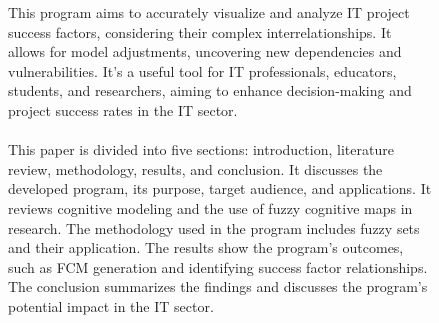 \documentclass{article}
\begin{document}
\begin{figure}[!t]
\begin{minipage}{0.49\textwidth}
            This program aims to accurately visualize and analyze IT project success factors, considering their complex interrelationships. It allows for model adjustments, uncovering new dependencies and vulnerabilities. It's a useful tool for IT professionals, educators, students, and researchers, aiming to enhance decision-making and project success rates in the IT sector.\\
            ~\\
            This paper is divided into five sections: introduction, literature review, methodology, results, and conclusion. It discusses the developed program, its purpose, target audience, and applications. It reviews cognitive modeling and the use of fuzzy cognitive maps in research. The methodology used in the program includes fuzzy sets and their application. The results show the program's outcomes, such as FCM generation and identifying success factor relationships. The conclusion summarizes the findings and discusses the program's potential impact in the IT sector.\\
            ~\\
            ~\\
            ~\\
            ~\\
            ~\\
            ~\\
            ~\\
            ~\\
            ~\\
            ~\\
            ~\\
            ~\\
            ~\\
            ~\\
            ~\\
            ~\\
            ~\\
            ~\\
            ~\\
            ~\\
            ~\\
            ~\\
            ~\\
            ~\\
            ~\\
        \end{minipage}
        \hfill
        \begin{minipage}{0.49\textwidth}
            \begin{center}

\end{center}
\end{minipage}
\end{figure}
\end{document}
